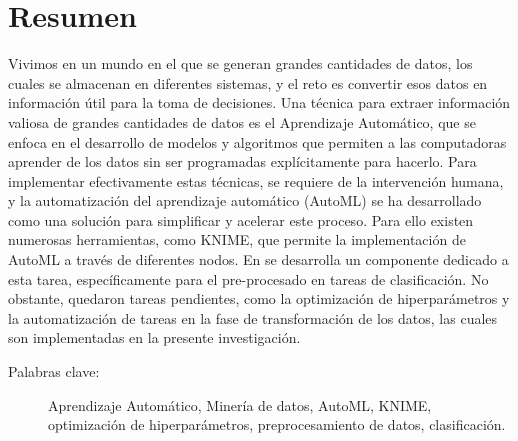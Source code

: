 \section*{Resumen}
Vivimos en un mundo en el que se generan grandes cantidades de datos, los cuales se almacenan en diferentes sistemas, y el reto es convertir esos datos en información útil para la toma de decisiones. Una técnica para extraer información valiosa de grandes cantidades de datos es el Aprendizaje Automático, que se enfoca en el desarrollo de modelos y algoritmos que permiten a las computadoras aprender de los datos sin ser programadas explícitamente para hacerlo. Para implementar efectivamente estas técnicas, se requiere de la intervención humana, y la automatización del aprendizaje automático (AutoML) se ha desarrollado como una solución para simplificar y acelerar este proceso. Para ello existen numerosas herramientas, como KNIME, que permite la implementación de AutoML a través de diferentes nodos. En \citep{Carrazana2022} se desarrolla un componente dedicado a esta tarea, específicamente para el pre-procesado en tareas de clasificación. No obstante, quedaron tareas pendientes, como la optimización de hiperparámetros y la automatización de tareas en la fase de transformación de los datos, las cuales son implementadas en la presente investigación. 



\begin{description}
	\item[Palabras clave:]{Aprendizaje Automático, Minería de datos, AutoML, KNIME, optimización de hiperparámetros, preprocesamiento de datos, clasificación.}
\end{description}


